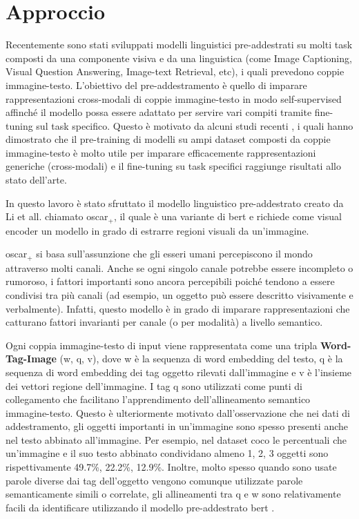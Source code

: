 \chapter{Approccio}
Recentemente sono stati sviluppati modelli linguistici pre-addestrati su molti task composti da una componente visiva e da una linguistica (come Image Captioning, Visual Question Answering, Image-text Retrieval, etc), i quali prevedono coppie immagine-testo. L'obiettivo del pre-addestramento è quello di imparare rappresentazioni cross-modali di coppie immagine-testo in modo self-supervised affinché il modello possa essere adattato per servire vari compiti tramite fine-tuning sul task specifico. Questo è motivato da alcuni studi recenti \cite{zhou2020unified, li2019visualbert, li2020unicoder}, i quali hanno dimostrato che il pre-training di modelli su ampi dataset composti da coppie immagine-testo è molto utile per imparare efficacemente rappresentazioni generiche (cross-modali) e il fine-tuning su task specifici raggiunge risultati allo stato dell'arte.

In questo lavoro è stato sfruttato il modello linguistico pre-addestrato creato da Li et all. \cite{li2020oscar, zhang2021vinvl} chiamato \acrshort{oscar}$_+$, il quale è una variante di \acrshort{bert} e richiede come visual encoder un modello in grado di estrarre regioni visuali da un'immagine. %

\acrshort{oscar}$_+$ si basa sull'assunzione che gli esseri umani percepiscono il mondo attraverso molti canali. Anche se ogni singolo canale potrebbe essere incompleto o rumoroso, i fattori importanti sono ancora percepibili poiché tendono a essere condivisi tra più canali (ad esempio, un oggetto può essere descritto visivamente e verbalmente). 
Infatti, questo modello è in grado di imparare rappresentazioni che catturano fattori invarianti per canale (o per modalità) a livello semantico.

Ogni coppia immagine-testo di input viene rappresentata come una tripla \textbf{Word-Tag-Image} (w, q, v), dove w è la sequenza di word embedding del testo, q è la sequenza di word embedding dei tag oggetto rilevati dall'immagine e v è l'insieme dei vettori regione dell'immagine. I tag q sono utilizzati come punti di collegamento che facilitano l'apprendimento dell'allineamento semantico immagine-testo. Questo è ulteriormente motivato dall'osservazione che nei dati di addestramento, gli oggetti importanti in un'immagine sono spesso presenti anche nel testo abbinato all'immagine. Per esempio, nel dataset \acrshort{coco} \cite{lin2014microsoft} le percentuali che un'immagine e il suo testo abbinato condividano almeno 1, 2, 3 oggetti sono rispettivamente 49.7\%, 22.2\%, 12.9\%. Inoltre, molto spesso quando sono usate parole diverse dai tag dell'oggetto vengono comunque utilizzate parole semanticamente simili o correlate, gli allineamenti tra q e w sono relativamente facili da identificare utilizzando il modello pre-addestrato \acrshort{bert} \cite{devlin2018bert}.


